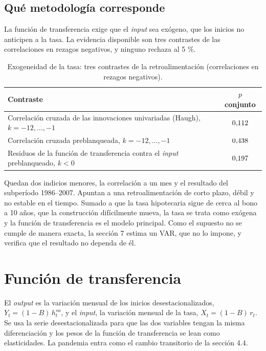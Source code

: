 \documentclass[11pt,a4paper]{article}
\begin{document}
\subsection{Qué metodología corresponde}

La función de transferencia exige que el \emph{input} sea exógeno, que los inicios no anticipen a la tasa. La evidencia disponible son tres contrastes de las correlaciones en rezagos negativos, y ninguno rechaza al 5 \%.

\begin{table}[htbp]\centering\small
\caption{Exogeneidad de la tasa: tres contrastes de la retroalimentaci\'on (correlaciones en rezagos negativos).}\label{tab:exog}
\begin{tabular}{lc}
\toprule
Contraste & $p$ conjunto \\
\midrule
Correlaci\'on cruzada de las innovaciones univariadas (Haugh), $k=-12,\dots,-1$ & $0{,}112$ \\
Correlaci\'on cruzada preblanqueada, $k=-12,\dots,-1$ & $0{,}438$ \\
Residuos de la funci\'on de transferencia contra el \emph{input} preblanqueado, $k<0$ & $0{,}197$ \\
\bottomrule
\end{tabular}
\end{table}


Quedan dos indicios menores, la correlación a un mes y el resultado del subperíodo 1986--2007. Apuntan a una retroalimentación de corto plazo, débil y no estable en el tiempo. Sumado a que la tasa hipotecaria sigue de cerca al bono a 10 años, que la construcción difícilmente mueva, la tasa se trata como exógena y la función de transferencia es el modelo principal. Como el supuesto no se cumple de manera exacta, la sección 7 estima un VAR, que no lo impone, y verifica que el resultado no dependa de él.

\section{Función de transferencia}

El \emph{output} es la variación mensual de los inicios desestacionalizados, $Y_t=(1-B)\,h^{sa}_t$, y el \emph{input}, la variación mensual de la tasa, $X_t=(1-B)\,r_t$. Se usa la serie desestacionalizada para que las dos variables tengan la misma diferenciación y los pesos de la función de transferencia se lean como elasticidades. La pandemia entra como el cambio transitorio de la sección 4.4.
\end{document}
